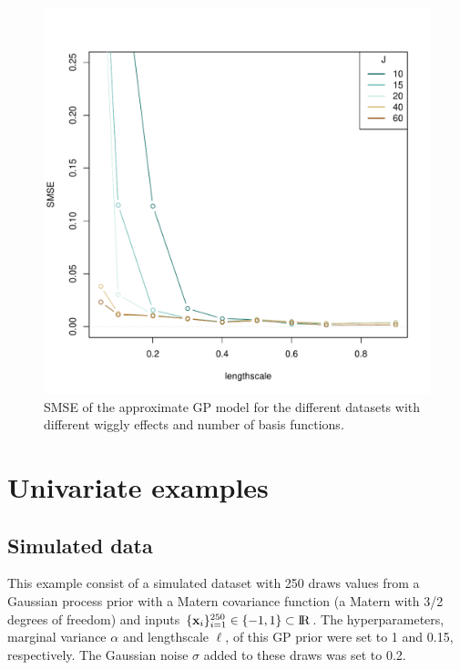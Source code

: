 \documentclass[]{interact}
\theoremstyle{plain}%
\theoremstyle{definition}
\theoremstyle{remark}
\begin{document}
\begin{figure}[H]
\centering
\includegraphics[scale=0.45]{fig9_MSE_varing_lscale.pdf}
\caption{SMSE of the approximate GP model for the different datasets with different wiggly effects and number of basis functions.}
  \label{fig9_MSE_varing_lscale}
\end{figure}


\vspace{3mm}
\section{Univariate examples}\label{sec:gp_examples1D}


\subsection{Simulated data}

This example consist of a simulated dataset with 250 draws values from a Gaussian process prior with a Matern covariance function (a Matern with 3/2 degrees of freedom) and inputs $\{\mathbf{x}_i\}_{i=1}^{250} \in \{-1,1\} \subset {\rm I\!R}$. The hyperparameters, marginal variance $\alpha$ and lengthscale $\ell$, of this GP prior were set to 1 and 0.15, respectively. The Gaussian noise $\sigma$ added to these draws was set to 0.2.
\end{document}
